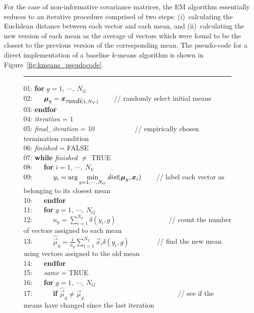 For the case of non-informative covariance matrices, the EM algorithm essentially reduces to an iterative procedure comprised of two steps:
(i)~calculating the Euclidean distance between each vector and each mean,
and
(ii)~calculating the new version of each mean as the average of vectors which were found to be the closest to the previous version of the corresponding mean.
The pseudo-code for a direct implementation of a baseline $k$-means algorithm is shown in Figure~\ref{fig:kmeans_pseudocode}.

\begin{figure}[!b]
\hrule
\begin{small}
\begin{tabbing}
01: {\bf for} $g=1, ~\cdots, ~N_G$ \\
02: ~~ $\Vec{\mu}_g = \Vec{x}_{ \mbox{\it randi}(1, N_V) } $ ~~~ {\small // randomly select initial means} \\
03: {\bf endfor} \\
04: {\it iteration} = $1$ \\
05: {\it final\_iteration} = $10$ ~~~ ~~~ ~~~ {\small // empirically chosen termination condition} \\
06: {\it finished} = FALSE \\
07: {\bf while} {\it finished} $\neq$ TRUE \\
08: ~~ {\bf for} $i=1, ~\cdots, ~N_V$ \\
09: ~~ ~~ \( y_i = {\displaystyle \arg \min_{g=1, \cdots, N_G}} \operatorname{\mbox{\it dist}}(\Vec{\mu}_g, \Vec{x}_i) \) ~~~ {\small // label each vector as belonging to its closest mean} \\
10: ~~ {\bf endfor} \\
11: ~~ {\bf for} $g=1, ~\cdots, ~N_G$ \\
12: ~~ ~~ $n_g = \sum\nolimits_{i=1}^{N_V} \delta(y_i, g) $  ~~~ ~~~ ~~~ ~~~ {\small // count the number of vectors assigned to each mean} \\
13: ~~ ~~ $\widehat{\Vec{\mu}}_g = \frac{1}{n_g} \sum\nolimits_{i=1}^{N_V} \Vec{x}_i \delta(y_i, g) $ ~~~ ~~~ {\small // find the new mean using vectors assigned to the old mean} \\
14: ~~ {\bf endfor} \\
15: ~~ {\it same} = TRUE \\
16: ~~ {\bf for} $g=1, ~\cdots, ~N_G$ \\
17: ~~ ~~ {\bf if} $\widehat{\Vec{\mu}}_g \neq \Vec{\mu}_g $  ~~~ ~~~ ~~~ ~~~ ~~~ ~~~ ~~~~ {\small // see if the means have changed since the last iteration} \\

\end{tabbing}
\end{small}
\end{figure}
